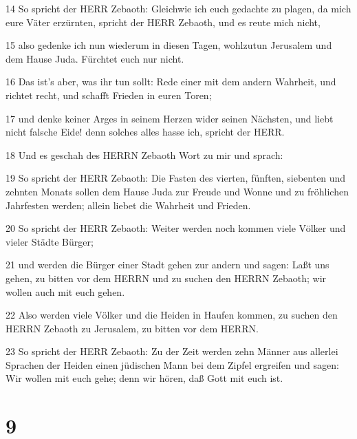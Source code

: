 \par 14 So spricht der HERR Zebaoth: Gleichwie ich euch gedachte zu plagen, da mich eure Väter erzürnten, spricht der HERR Zebaoth, und es reute mich nicht,
\par 15 also gedenke ich nun wiederum in diesen Tagen, wohlzutun Jerusalem und dem Hause Juda. Fürchtet euch nur nicht.
\par 16 Das ist's aber, was ihr tun sollt: Rede einer mit dem andern Wahrheit, und richtet recht, und schafft Frieden in euren Toren;
\par 17 und denke keiner Arges in seinem Herzen wider seinen Nächsten, und liebt nicht falsche Eide! denn solches alles hasse ich, spricht der HERR.
\par 18 Und es geschah des HERRN Zebaoth Wort zu mir und sprach:
\par 19 So spricht der HERR Zebaoth: Die Fasten des vierten, fünften, siebenten und zehnten Monats sollen dem Hause Juda zur Freude und Wonne und zu fröhlichen Jahrfesten werden; allein liebet die Wahrheit und Frieden.
\par 20 So spricht der HERR Zebaoth: Weiter werden noch kommen viele Völker und vieler Städte Bürger;
\par 21 und werden die Bürger einer Stadt gehen zur andern und sagen: Laßt uns gehen, zu bitten vor dem HERRN und zu suchen den HERRN Zebaoth; wir wollen auch mit euch gehen.
\par 22 Also werden viele Völker und die Heiden in Haufen kommen, zu suchen den HERRN Zebaoth zu Jerusalem, zu bitten vor dem HERRN.
\par 23 So spricht der HERR Zebaoth: Zu der Zeit werden zehn Männer aus allerlei Sprachen der Heiden einen jüdischen Mann bei dem Zipfel ergreifen und sagen: Wir wollen mit euch gehe; denn wir hören, daß Gott mit euch ist.

\chapter{9}


